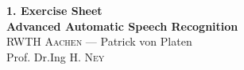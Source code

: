 \documentclass[12pt,oneside,a4paper]{article}
\begin{document}
\begin{center}
{\LARGE \bfseries 
 1. Exercise Sheet  \\[0.1cm] 
}
{ \large \bfseries
 Advanced Automatic Speech Recognition \\[0.3cm] %
}
{\large
  \textsc{RWTH Aachen} --- Patrick von Platen \\[0.3cm]
}
{\normalsize
  Prof. Dr.Ing H. \textsc{Ney} \\[0.92cm] %
}
\end{center}
  
 \newpage
 \newpage

\end{document}
